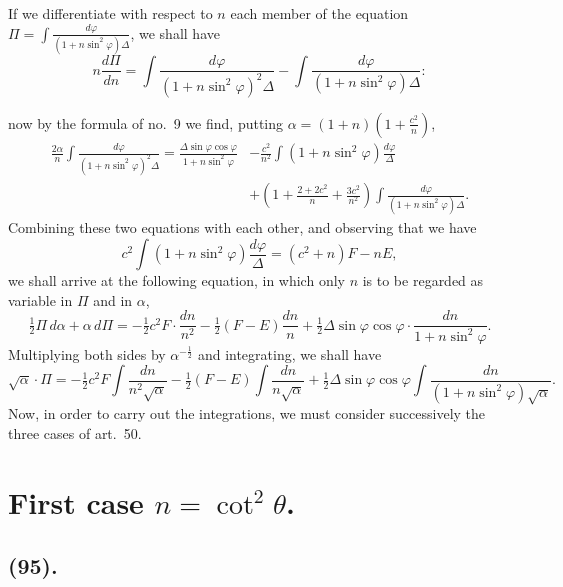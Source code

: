 \documentclass{article}
\begin{document}
If we differentiate with respect to $n$ each member of the equation $\Pi=\displaystyle\int\frac{d\varphi}{(1+n\sin^{2}\varphi)\Delta}$, we shall have
\[ n\frac{d\Pi}{dn}=\int\frac{d\varphi}{(1+n\sin^{2}\varphi)^{2}\Delta}-\int\frac{d\varphi}{(1+n\sin^{2}\varphi)\Delta}: \]

now by the formula of no.\ 9 we find, putting $\alpha=(1+n)\left(1+\frac{c^{2}}{n}\right)$,
\[ \begin{aligned} \frac{2\alpha}{n}\int\frac{d\varphi}{(1+n\sin^{2}\varphi)^{2}\Delta}=\frac{\Delta\sin\varphi\cos\varphi}{1+n\sin^{2}\varphi}&-\frac{c^{2}}{n^{2}}\int(1+n\sin^{2}\varphi)\frac{d\varphi}{\Delta}\\ &+\left(1+\frac{2+2c^{2}}{n}+\frac{3c^{2}}{n^{2}}\right)\int\frac{d\varphi}{(1+n\sin^{2}\varphi)\Delta}. \end{aligned} \]
Combining these two equations with each other, and observing that we have
\[ c^{2}\int(1+n\sin^{2}\varphi)\frac{d\varphi}{\Delta}=(c^{2}+n)F-nE, \]
we shall arrive at the following equation, in which only $n$ is to be regarded as variable in $\Pi$ and in $\alpha$,
\[ \tfrac{1}{2}\Pi\,d\alpha+\alpha\,d\Pi=-\tfrac{1}{2}c^{2}F\cdot\frac{dn}{n^{2}}-\tfrac{1}{2}(F-E)\frac{dn}{n}+\tfrac{1}{2}\Delta\sin\varphi\cos\varphi\cdot\frac{dn}{1+n\sin^{2}\varphi}. \]
Multiplying both sides by $\alpha^{-\frac{1}{2}}$ and integrating, we shall have
\[ \sqrt{\alpha}\cdot\Pi=-\tfrac{1}{2}c^{2}F\int\frac{dn}{n^{2}\sqrt{\alpha}}-\tfrac{1}{2}(F-E)\int\frac{dn}{n\sqrt{\alpha}}+\tfrac{1}{2}\Delta\sin\varphi\cos\varphi\int\frac{dn}{(1+n\sin^{2}\varphi)\sqrt{\alpha}}. \]
Now, in order to carry out the integrations, we must consider successively the three cases of art.\ 50.

\section*{First case $n=\cot^{2}\theta$.}

\subsection*{(95).}
\end{document}
